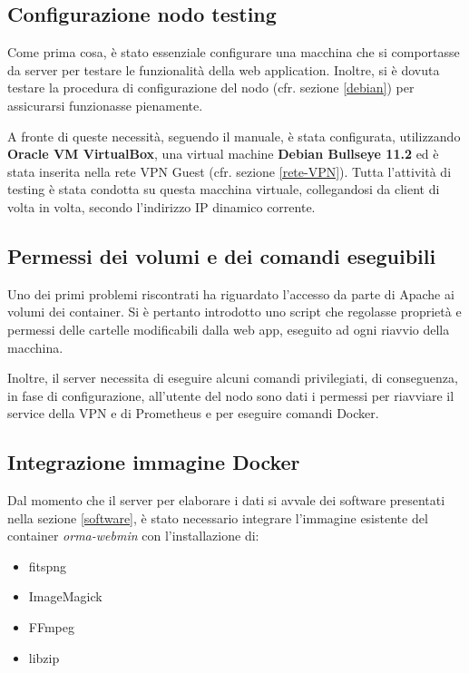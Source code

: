 \subsection{Configurazione nodo testing} \label{conf-nodo-testing}

Come prima cosa, è stato essenziale configurare una macchina che si comportasse da server per testare le funzionalità della web application.
Inoltre, si è dovuta testare la procedura di configurazione del nodo (cfr. sezione \ref{debian}) per assicurarsi funzionasse pienamente.

A fronte di queste necessità, seguendo il manuale, è stata configurata, utilizzando \textbf{Oracle VM VirtualBox}, una virtual machine \textbf{Debian Bullseye 11.2} ed è stata inserita nella rete VPN Guest (cfr. sezione \ref{rete-VPN}). Tutta l'attività di testing è stata condotta su questa macchina virtuale, collegandosi da client di volta in volta, secondo l'indirizzo IP dinamico corrente.

\subsection{Permessi dei volumi e dei comandi eseguibili} \label{permessi-macchina}

Uno dei primi problemi riscontrati ha riguardato l'accesso da parte di Apache ai volumi dei container. Si è pertanto introdotto uno script che regolasse proprietà e permessi delle cartelle modificabili dalla web app, eseguito ad ogni riavvio della macchina.

Inoltre, il server necessita di eseguire alcuni comandi privilegiati, di conseguenza, in fase di configurazione, all'utente del nodo sono dati i permessi per riavviare il service della VPN e di Prometheus e per eseguire comandi Docker.

\subsection{Integrazione immagine Docker}

Dal momento che il server per elaborare i dati si avvale dei software presentati nella sezione \ref{software}, è stato necessario integrare l'immagine esistente del container \emph{orma-webmin} con l'installazione di:
\begin{itemize}[noitemsep,nolistsep]
    \item fitspng
    \item ImageMagick
    \item FFmpeg
    \item libzip
\end{itemize}

